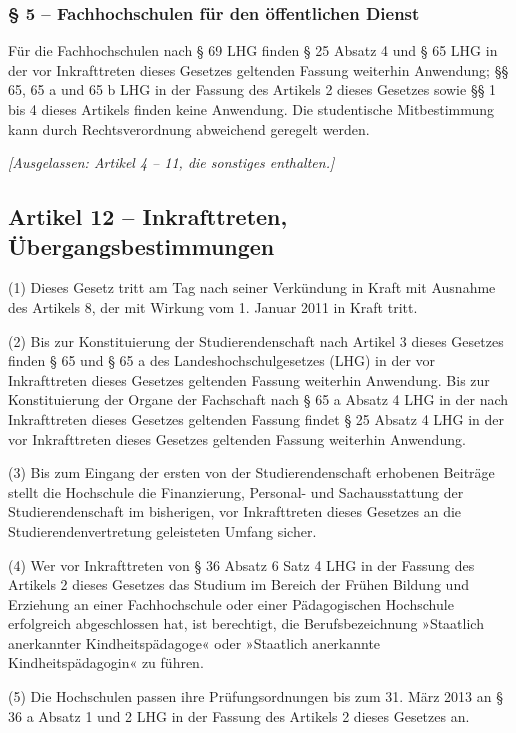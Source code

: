 \documentclass[
10pt,
a4paper,
twoside,								%
titlepage=false,							%
draft=false								%
]{scrartcl}
\begin{document}
\subsubsection*{§ 5 – Fachhochschulen für den öffentlichen Dienst}

Für die Fachhochschulen nach § 69 LHG finden § 25 Absatz 4 und § 65 LHG in der vor Inkrafttreten dieses Gesetzes geltenden Fassung weiterhin Anwendung; §§ 65, 65 a und 65 b LHG in der Fassung des Artikels 2 dieses Gesetzes sowie §§ 1 bis 4 dieses Artikels finden keine Anwendung. Die studentische Mitbestimmung kann durch Rechtsverordnung abweichend geregelt werden.


\bigskip
\emph{[Ausgelassen: Artikel 4 – 11, die sonstiges enthalten.]}


\subsection{Artikel 12 – Inkrafttreten, Übergangsbestimmungen}

(1) Dieses Gesetz tritt am Tag nach seiner Verkündung in Kraft mit Ausnahme des Artikels 8, der mit Wirkung vom 1. Januar 2011 in Kraft tritt.

(2) Bis zur Konstituierung der Studierendenschaft nach Artikel 3 dieses Gesetzes finden § 65 und § 65 a des Landeshochschulgesetzes (LHG) in der vor Inkrafttreten dieses Gesetzes geltenden Fassung weiterhin Anwendung. Bis zur Konstituierung der Organe der Fachschaft nach § 65 a Absatz 4 LHG in der nach Inkrafttreten dieses Gesetzes geltenden Fassung findet § 25 Absatz 4 LHG in der vor Inkrafttreten dieses Gesetzes geltenden Fassung weiterhin Anwendung. 

(3) Bis zum Eingang der ersten von der Studierendenschaft erhobenen Beiträge stellt die Hochschule die Finanzierung, Personal- und Sachausstattung der Studierendenschaft im bisherigen, vor Inkrafttreten dieses Gesetzes an die Studierendenvertretung geleisteten Umfang sicher.

(4) Wer vor Inkrafttreten von § 36 Absatz 6 Satz 4 LHG in der Fassung des Artikels 2 dieses Gesetzes das Studium im Bereich der Frühen Bildung und Erziehung an einer Fachhochschule oder einer Pädagogischen Hochschule erfolgreich abgeschlossen hat, ist berechtigt, die Berufsbezeichnung »Staatlich anerkannter Kindheitspädagoge« oder »Staatlich anerkannte Kindheitspädagogin« zu führen.

(5) Die Hochschulen passen ihre Prüfungsordnungen bis zum 31. März 2013 an § 36 a Absatz 1 und 2 LHG in der Fassung des Artikels 2 dieses Gesetzes an.
\end{document}
